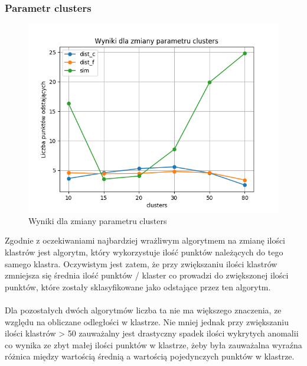 \documentclass[eng,printmode]{mgr}
\begin{document}
\subsubsection{Parametr clusters}
\begin{figure}[H]
  \begin{center}
  \includegraphics[scale=0.7]{avg_clusters}
  \end{center}
  \caption{Wyniki dla zmiany parametru clusters}
  \label{fig:avg_clusters}
\end{figure}
Zgodnie z oczekiwaniami najbardziej wrażliwym algorytmem na zmianę ilości klastrów jest algorytm, który wykorzystuje ilość punktów należących do tego samego klastra. Oczywistym jest zatem, że przy zwiększaniu ilości klastrów zmniejsza się średnia ilość punktów / klaster co prowadzi do zwiększonej ilości punktów, które zostały sklasyfikowane jako odstające przez ten algorytm.
\\\\
Dla pozostałych dwóch algorytmów liczba ta nie ma większego znaczenia, ze względu na obliczane odległości w klastrze. Nie mniej jednak przy zwiększaniu ilości klastrów > 50 zauważalny jest drastyczny spadek ilości wykrytych anomalii co wynika ze zbyt małej ilości punktów w klastrze, żeby była zauważalna wyraźna różnica między wartością średnią a wartością pojedynczych punktów w klastrze.
\end{document}
